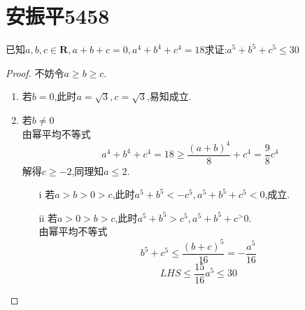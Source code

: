 \documentclass[]{article}
\title{}
\author{}
\date{}
\begin{document}
\maketitle
\section{安振平5458}{
已知$a,b,c \in \mathbf{R},a+b+c=0,a^4+b^4+c^4=18$求证:$a^5+b^5+c^5\leq 30$

\begin{proof}
不妨令$a\geq b\geq c$.\\
\begin{enumerate}
    \item 若$b=0$,此时$\displaystyle a=\sqrt{3},c=\sqrt{3}$,易知成立.
    \item 若$b\neq 0$\\
    由幂平均不等式
    \begin{equation}\nonumber
        a^4+b^4+c^4=18\geq \frac{(a+b)^4}{8}+c^4=\frac{9}{8}c^4
    \end{equation}
    解得$c\geq -2$,同理知$a\leq 2$.
    \begin{enumerate}
        \item[i] 若$a>b>0>c$,此时$a^5+b^5<-c^5,a^5+b^5+c^5<0$,成立.
        \item[ii] 若$a>0>b>c$,此时$a^5+b^5>c^5,a^5+b^5+c^>0$.\\
        由幂平均不等式
        \begin{equation}\nonumber
            b^5+c^5\leq \frac{(b+c)^5}{16}=-\frac{a^5}{16}
        \end{equation}
        \begin{equation}\nonumber
            LHS\leq \frac{15}{16}a^5\leq 30
        \end{equation}
    \end{enumerate}
\end{enumerate}
\end{proof}
}
\end{document}
